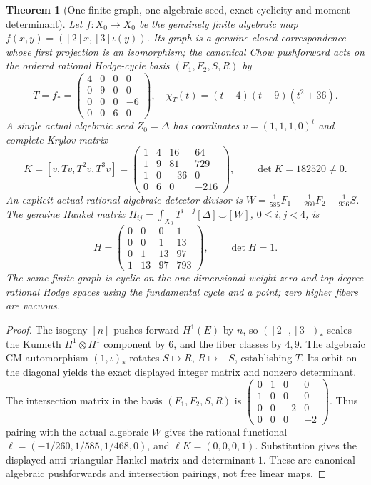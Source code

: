 \documentclass[11pt]{article}
\newtheorem{theorem}{Theorem}
\begin{document}
\begin{theorem}[One finite graph, one algebraic seed, exact cyclicity and moment determinant]
Let \(f:X_0\to X_0\) be the genuinely finite algebraic map
\(f(x,y)=([2]x,[3]\iota(y))\).
Its graph is a genuine closed correspondence whose first projection is an isomorphism; the canonical Chow pushforward acts on the ordered rational Hodge-cycle basis \((F_1,F_2,S,R)\) by
\[
 T=f_*=\begin{pmatrix}4&0&0&0\\0&9&0&0\\0&0&0&-6\\0&0&6&0\end{pmatrix},
 \quad \chi_T(t)=(t-4)(t-9)(t^2+36).
\]
A single actual algebraic seed \(Z_0=\Delta\) has coordinates \(v=(1,1,1,0)^t\) and complete Krylov matrix
\[
 K=[v,Tv,T^2v,T^3v]
 =\begin{pmatrix}1&4&16&64\\1&9&81&729\\1&0&-36&0\\0&6&0&-216\end{pmatrix},
 \qquad \boxed{\det K=182520\ne0}.
\]
An explicit actual rational algebraic detector divisor is
\(W=\frac1{585}F_1-\frac1{260}F_2-\frac1{936}S\).
The genuine Hankel matrix \(H_{ij}=\int_{X_0}T^{i+j}[\Delta]\smile[W]\), \(0\le i,j<4\), is
\[
 H=\begin{pmatrix}0&0&0&1\\0&0&1&13\\0&1&13&97\\1&13&97&793\end{pmatrix},
 \qquad\boxed{\det H=1}.
\]
The same finite graph is cyclic on the one-dimensional weight-zero and top-degree rational Hodge spaces using the fundamental cycle and a point; zero higher fibers are vacuous.
\end{theorem}
\begin{proof}
The isogeny \([n]\) pushes forward \(H^1(E)\) by \(n\), so \(([2],[3])_*\) scales the Kunneth \(H^1\otimes H^1\) component by \(6\), and the fiber classes by \(4,9\). The algebraic CM automorphism \((1,\iota)_*\) rotates \(S\mapsto R\), \(R\mapsto-S\), establishing \(T\). Its orbit on the diagonal yields the exact displayed integer matrix and nonzero determinant. The intersection matrix in the basis \((F_1,F_2,S,R)\) is
\(\left(\begin{smallmatrix}0&1&0&0\\1&0&0&0\\0&0&-2&0\\0&0&0&-2\end{smallmatrix}\right)\).
Thus pairing with the actual algebraic \(W\) gives the rational functional
\(\ell=(-1/260,1/585,1/468,0)\), and
\(\ell K=(0,0,0,1)\).
Substitution gives the displayed anti-triangular Hankel matrix and determinant \(1\). These are canonical algebraic pushforwards and intersection pairings, not free linear maps.
\end{proof}
\end{document}
